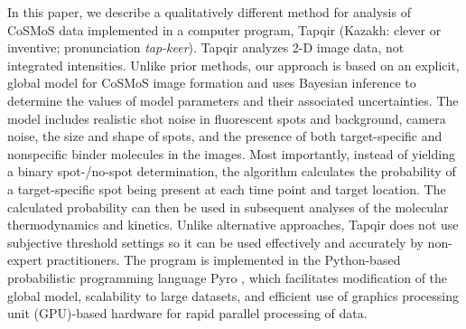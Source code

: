 In this paper, we describe a qualitatively different method for analysis of CoSMoS data implemented in a computer program, Tapqir (Kazakh: clever or inventive; pronunciation \emph{tap-keer}). Tapqir analyzes 2-D image data, not integrated intensities.  Unlike prior methods, our approach is based on an explicit, global model for CoSMoS image formation and uses Bayesian inference to determine the values of model parameters and their associated uncertainties. The model includes realistic shot noise in fluorescent spots and background, camera noise, the size and shape of spots, and the presence of both target-specific and nonspecific binder molecules in the images. Most importantly, instead of yielding a binary spot-/no-spot determination, the algorithm calculates the probability of a target-specific spot being present at each time point and target location. The calculated probability can then be used in subsequent analyses of the molecular thermodynamics and kinetics. Unlike alternative approaches, Tapqir does not use subjective threshold settings so it can be used effectively and accurately by non-expert practitioners. The program is implemented in the Python-based probabilistic programming language Pyro \cite{Bingham2019-qy}, which facilitates modification of the global model, scalability to large datasets, and efficient use of graphics processing unit (GPU)-based hardware for rapid parallel processing of data. 